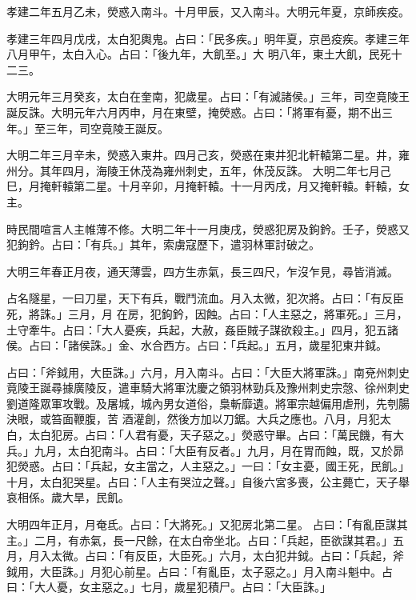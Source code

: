\begin{pinyinscope}
 孝建二年五月乙未，熒惑入南斗。十月甲辰，又入南斗。大明元年夏，京師疾疫。



 孝建三年四月戊戌，太白犯輿鬼。占曰：「民多疾。」明年夏，京邑疫疾。孝建三年八月甲午，太白入心。占曰：「後九年，大飢至。」大
 明八年，東土大飢，民死十二三。



 大明元年三月癸亥，太白在奎南，犯歲星。占曰：「有滅諸侯。」三年，司空竟陵王誕反誅。大明元年六月丙申，月在東壁，掩熒惑。占曰：「將軍有憂，期不出三年。」至三年，司空竟陵王誕反。



 大明二年三月辛未，熒惑入東井。四月己亥，熒惑在東井犯北軒轅第二星。井，雍州分。其年四月，海陵王休茂為雍州刺史，五年，休茂反誅。
 大明二年七月己巳，月掩軒轅第二星。十月辛卯，月掩軒轅。十一月丙戌，月又掩軒轅。軒轅，女主。



 時民間喧言人主帷薄不修。大明二年十一月庚戌，熒惑犯房及鉤鈐。壬子，熒惑又犯鉤鈐。占曰：「有兵。」其年，索虜寇歷下，遣羽林軍討破之。



 大明三年春正月夜，通天薄雲，四方生赤氣，長三四尺，乍沒乍見，尋皆消滅。



 占名隧星，一曰刀星，天下有兵，戰鬥流血。月入太微，犯次將。占曰：「有反臣死，將誅。」三月，月
 在房，犯鉤鈐，因蝕。占曰：「人主惡之，將軍死。」三月，土守牽牛。占曰：「大人憂疾，兵起，大赦，姦臣賊子謀欲殺主。」四月，犯五諸侯。占曰：「諸侯誅。」金、水合西方。占曰：「兵起。」五月，歲星犯東井鉞。



 占曰：「斧鉞用，大臣誅。」六月，月入南斗。占曰：「大臣大將軍誅。」南兗州刺史竟陵王誕尋據廣陵反，遣車騎大將軍沈慶之領羽林勁兵及豫州刺史宗愨、徐州刺史劉道隆眾軍攻戰。及屠城，城內男女道俗，梟斬靡遺。將軍宗越偏用虐刑，先刳腸決眼，或笞面鞭腹，苦
 酒灌創，然後方加以刀鋸。大兵之應也。八月，月犯太白，太白犯房。占曰：「人君有憂，天子惡之。」熒惑守畢。占曰：「萬民饑，有大兵。」九月，太白犯南斗。占曰：「大臣有反者。」九月，月在胃而蝕，既，又於昴犯熒惑。占曰：「兵起，女主當之，人主惡之。」一曰：「女主憂，國王死，民飢。」十月，太白犯哭星。占曰：「人主有哭泣之聲。」自後六宮多喪，公主薨亡，天子舉哀相係。歲大旱，民飢。



 大明四年正月，月奄氐。占曰：「大將死。」又犯房北第二星。
 占曰：「有亂臣謀其主。」二月，有赤氣，長一尺餘，在太白帝坐北。占曰：「兵起，臣欲謀其君。」五月，月入太微。占曰：「有反臣，大臣死。」六月，太白犯井鉞。占曰：「兵起，斧鉞用，大臣誅。」月犯心前星。占曰：「有亂臣，太子惡之。」月入南斗魁中。占曰：「大人憂，女主惡之。」七月，歲星犯積尸。占曰：「大臣誅。」




\end{pinyinscope}
